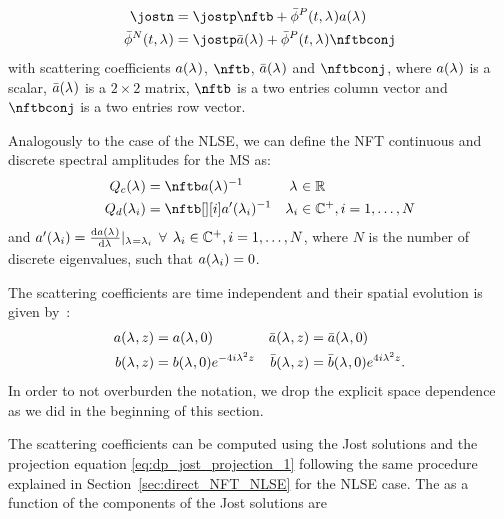 \begin{subequations}\label{eq:dp_jost_projection}
  \begin{align}\label{eq:dp_jost_projection_1}
  \jostn&=\jostp \nftb+ \jostpconj \nfta\\
  \jostnconj&=\jostp \nftaconj+ \jostpconj \nftbconj
  \end{align}
\end{subequations}
with scattering coefficients $\nfta$, $\nftb$, $\nftaconj$ and $\nftbconj$, where $\nfta$ is a scalar,
$\nftaconj$ is a $2\times2$ matrix, $\nftb$ is a two entries column vector and
$\nftbconj$ is a two entries row vector.


Analogously to the case of the \ac{NLSE}, we can define the \ac{NFT} continuous and discrete spectral amplitudes for the \ac{MS} as:
\begin{subequations}
\begin{align}
\cnft&=\nftb\nfta^{-1} & \eig&\in \RR\\
\dnft[i]&=\nftb[][i]\nftaderiv[i]^{-1}  & \eig[i] &\in \CC^+, i = 1,\dots, N
\end{align}
\end{subequations}
and $\nftaderiv[i]=\dv{\nfta}{\eig}|_{\eig=\eig[i]}$ $\forall$ $\eig[i] \in \CC^+, i = 1,\dots, N$, where $N$ is the number of discrete eigenvalues, such
that $\nfta[i]=0$.

The scattering coefficients are time independent and their spatial evolution is given by~\cite{Ablowitz2004a}:
\begin{subequations}
\begin{align}\label{eq:dp_ch_transfer_function}
a(\eig,\nssp)&=a(\eig, 0) & \bar{a}(\eig,\nssp)&=\bar{a}(\eig,0) \\
b(\eig,\nssp)&=b(\eig,0)e^{-4\iunit\eig^2\nssp} & \bar{b}(\eig,\nssp)&=\bar{b}(\eig,0)e^{4\iunit\eig^2\nssp}.\label{eq:bscatcoeff}
\end{align}
\end{subequations}
In order to not overburden the notation, we drop the explicit space dependence as we did in the beginning of this section.

The scattering coefficients can be computed  using the Jost solutions and the projection equation \eqref{eq:dp_jost_projection_1} following the same procedure explained in Section~\ref{sec:direct_NFT_NLSE} for the \ac{NLSE} case. The \scatcoef{} as a function of the components of the Jost solutions are

